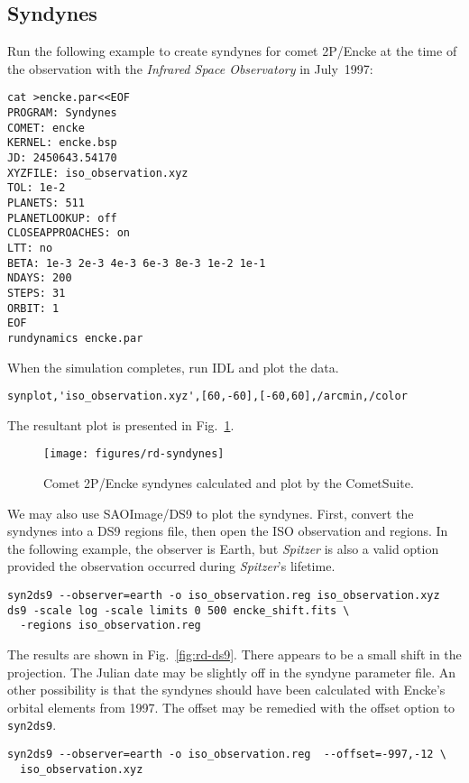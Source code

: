 \documentclass[12pt,letterpaper]{article}
\newcommand\spitzer{\textit{Spitzer}}
\newcommand\isolong{\textit{Infrared Space Observatory}}
\newcommand\cs{CometSuite}
\begin{document}
\subsection{Syndynes}\label{sec:rd-example}
Run the following example to create syndynes for comet 2P/Encke at the
time of the \citet{reach00} observation with the \isolong{} in
July~1997:
\begin{lstlisting}
cat >encke.par<<EOF
PROGRAM: Syndynes
COMET: encke
KERNEL: encke.bsp
JD: 2450643.54170
XYZFILE: iso_observation.xyz
TOL: 1e-2
PLANETS: 511
PLANETLOOKUP: off
CLOSEAPPROACHES: on
LTT: no
BETA: 1e-3 2e-3 4e-3 6e-3 8e-3 1e-2 1e-1
NDAYS: 200
STEPS: 31
ORBIT: 1
EOF
rundynamics encke.par
\end{lstlisting}
When the simulation completes, run IDL and plot the data.
\begin{lstlisting}
synplot,'iso_observation.xyz',[60,-60],[-60,60],/arcmin,/color
\end{lstlisting}
The resultant plot is presented in Fig.~\ref{fig:rd-syndynes}.

\begin{figure}
\center
\texttt{[image: figures/rd-syndynes]}
\caption{Comet 2P/Encke syndynes calculated and plot by the
\cs{}. \label{fig:rd-syndynes}}
\end{figure}

We may also use SAOImage/DS9 to plot the syndynes.  First, convert the
syndynes into a DS9 regions file, then open the ISO observation and
regions.  In the following example, the observer is Earth, but
\spitzer{} is also a valid option provided the observation occurred
during \textit{Spitzer}'s lifetime.
\begin{lstlisting}
syn2ds9 --observer=earth -o iso_observation.reg iso_observation.xyz
ds9 -scale log -scale limits 0 500 encke_shift.fits \
  -regions iso_observation.reg
\end{lstlisting}
The results are shown in Fig.~\ref{fig:rd-ds9}.  There appears to be a
small shift in the projection.  The Julian date may be slightly off in
the syndyne parameter file.  An other possibility is that the syndynes
should have been calculated with Encke's orbital elements from 1997.
The offset may be remedied with the offset option to \texttt{syn2ds9}.
\begin{lstlisting}
syn2ds9 --observer=earth -o iso_observation.reg  --offset=-997,-12 \
  iso_observation.xyz
\end{lstlisting}
\end{document}

